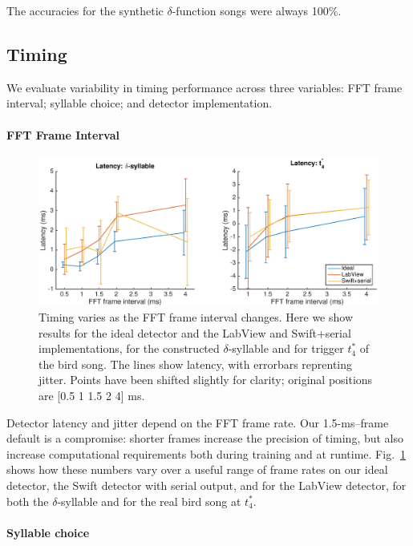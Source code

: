 \documentclass[10pt,letterpaper]{article}
\newcommand\fig[1]{Fig.~\ref{#1}}
\renewcommand{\subsubsection}[1]{\paragraph{#1}}
\begin{document}
The accuracies for the synthetic $\delta$-function songs were always 100\%.

\subsection{Timing}

We evaluate variability in timing performance across three variables: FFT frame interval; syllable choice; and detector implementation.

\subsubsection{FFT Frame Interval}

\begin{figure}
  \includegraphics[width=\textwidth]{TimingVsFrame}
  \caption{Timing varies as the FFT frame interval changes.  Here we show results for the ideal detector and the LabView and Swift+serial implementations, for the constructed $\delta$-syllable and for trigger $t^*_4$ of the bird song.  The lines show latency, with errorbars reprenting jitter.  Points have been shifted slightly for clarity; original positions are [0.5 1 1.5 2 4] ms.}
  \label{fig:TimingVsFrame}
\end{figure}

Detector latency and jitter depend on the FFT frame rate.  Our 1.5-ms--frame default is a compromise: shorter frames increase the precision of timing, but also increase computational requirements both during training and at runtime.  \fig{fig:TimingVsFrame} shows how these numbers vary over a useful range of frame rates on our ideal detector, the Swift detector with serial output, and for the LabView detector, for both the $\delta$-syllable and for the real bird song at $t^*_4$.

\subsubsection{Syllable choice}
\end{document}
